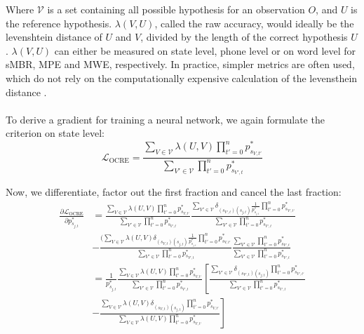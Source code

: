 Where $\mathcal{V}$ is a set containing all possible hypothesis for an observation $O$, and $U$ is the reference hypothesis. $\lambda(V,U)$, called the raw accuracy, would ideally be the levenshtein distance of $U$ and $V$, divided by the length of the correct hypothesis $U$. $\lambda(V,U)$ can either be measured on state level, phone level or on word level for sMBR, MPE and MWE, respectively. In practice, simpler metrics are often used, which do not rely on the computationally expensive calculation of the levensthein distance \cite{povey2002minimum}.\\ \\
To derive a gradient for training a neural network, we again formulate the criterion on state level:
\[
\mathcal{L}_{\text{OCRE}} = \frac{\sum_{V \in \mathcal{V}}\lambda(U,V)\prod_{t' = 0}^{n} p^*_{s_{V,t'}}}{\sum_{V' \in \mathcal{V}} \prod_{t' = 0}^{n} p^*_{s_{V',t}}} 
\]
\iffalse
Derivative of the P stuff: 
\begin{align*}
\frac{\partial \prod_{t' = 0}^{n} p^*_{s_{V,t'}}}{\partial p^*_{s_{j,t}}} &= \delta_{(s_{V,t})(s_{j,t})} \frac{1}{p^*_{s_{j,t}}} \prod_{t' = 0}^{n} p^*_{s_{V,t'}} \\
\end{align*}
\fi
Now, we differentiate, factor out the first fraction and cancel the last fraction:
\begin{align*}
\frac{\partial\mathcal{L}_{\text{OCRE}}}{\partial p^*_{s_{j,t}}} &= \frac{\sum_{V \in \mathcal{V}}\lambda(U,V)\prod_{t' = 0}^{n} p^*_{s_{V,t'}}}{\sum_{V' \in \mathcal{V}} \prod_{t' = 0}^{n} p^*_{s_{V',t}}}
\frac{\sum_{V' \in \mathcal{V}}\delta_{(s_{V',t})(s_{j,t})} \frac{1}{p^*_{s_{j,t}}} \prod_{t' = 0}^{n} p^*_{s_{V',t'}}}{\sum_{V' \in \mathcal{V}} \prod_{t' = 0}^{n} p^*_{s_{V',t}}}  \\
&- \frac{(\sum_{V \in \mathcal{V}}\lambda(U,V)\delta_{(s_{V,t})(s_{j,t})} \frac{1}{p^*_{s_{j,t}}} \prod_{t' = 0}^{n} p^*_{s_{V,t'}}}{\sum_{V' \in \mathcal{V}} \prod_{t' = 0}^{n} p^*_{s_{V',t}}}
\frac{\sum_{V' \in \mathcal{V}} \prod_{t' = 0}^{n} p^*_{s_{V',t}}}{\sum_{V' \in \mathcal{V}} \prod_{t' = 0}^{n} p^*_{s_{V',t}}} \\
&= \frac{1}{p^*_{s_{j,t}}} \frac{\sum_{V \in \mathcal{V}}\lambda(U,V)\prod_{t' = 0}^{n} p^*_{s_{V,t'}}}{\sum_{V' \in \mathcal{V}} \prod_{t' = 0}^{n} p^*_{s_{V',t}}} \left[
\frac{\sum_{V' \in \mathcal{V}}\delta_{(s_{V',t})(s_{j,t})} \prod_{t' = 0}^{n} p^*_{s_{V',t'}}}{\sum_{V' \in \mathcal{V}} \prod_{t' = 0}^{n} p^*_{s_{V',t}}} \right. \\
&- \left. \frac{\sum_{V \in \mathcal{V}}\lambda(U,V)\delta_{(s_{V,t})(s_{j,t})} \prod_{t' = 0}^{n} p^*_{s_{V,t'}}}{\sum_{V \in \mathcal{V}}\lambda(U,V)\prod_{t' = 0}^{n} p^*_{s_{V,t'}}} \right]
\end{align*}
